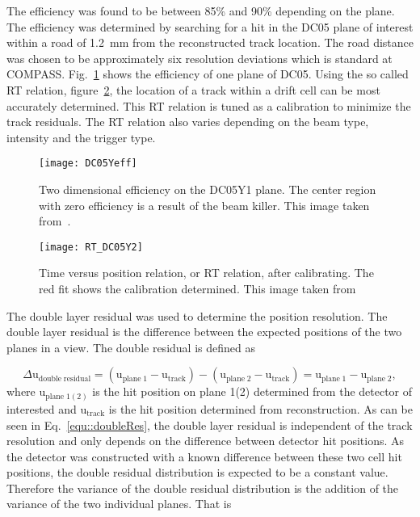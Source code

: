 The efficiency was found to be between 85\% and 90\% depending on the plane.
The efficiency was determined by searching for a hit in the DC05 plane of
interest within a road of 1.2~mm from the reconstructed track location.  The
road distance was chosen to be approximately six resolution deviations which is
standard at COMPASS.  Fig.~\ref{fig::DC05Yeff} shows the efficiency of one plane
of DC05.  Using the so called RT relation, figure~\ref{fig:RT_DC05Y2}, the
location of a track within a drift cell can be most accurately determined.  This
RT relation is tuned as a calibration to minimize the track residuals.  The RT
relation also varies depending on the beam type, intensity and the trigger type.

\begin{figure}[h!t]
  \centering \texttt{[image: DC05Yeff]}
  \caption{Two dimensional efficiency on the DC05Y1 plane.  The center region
    with zero efficiency is a result of the beam killer.  This image taken
    from~\cite{heitzDC05Spin}.}
  \label{fig::DC05Yeff}%
\end{figure}

\begin{figure}[h!t]
  \centering \texttt{[image: RT\_DC05Y2]}
  \caption{Time versus position relation, or RT relation, after calibrating.
    The red fit shows the calibration determined.  This image taken
    from~\cite{heitzDC05Spin}}
  \label{fig:RT_DC05Y2}%
\end{figure}

The double layer residual was used to determine the position resolution.  The
double layer residual is the difference between the expected positions of the
two planes in a view.  The double residual is defined as

\begin{equation}
  \label{equ::doubleRes}
  \Delta \mathrm{u}_{\mathrm{double \; residual}} = (\mathrm{u}_{\mathrm{plane
      \; 1}} - \mathrm{u}_{\mathrm{track}}) - (\mathrm{u}_{\mathrm{plane \; 2}}
  - \mathrm{u}_{\mathrm{track}}) = \mathrm{u}_{\mathrm{plane \; 1}} -
  \mathrm{u}_{\mathrm{plane \; 2}},
\end{equation}
\noindent
where u$_{\mathrm{plane \; 1(2)}}$ is the hit position on plane 1(2) determined
from the detector of interested and u$_{\mathrm{track}}$ is the hit position
determined from reconstruction.  As can be seen in Eq.~\ref{equ::doubleRes}, the
double layer residual is independent of the track resolution and only depends on
the difference between detector hit positions.  As the detector was constructed
with a known difference between these two cell hit positions, the double
residual distribution is expected to be a constant value.  Therefore the
variance of the double residual distribution is the addition of the variance of
the two individual planes.  That is

